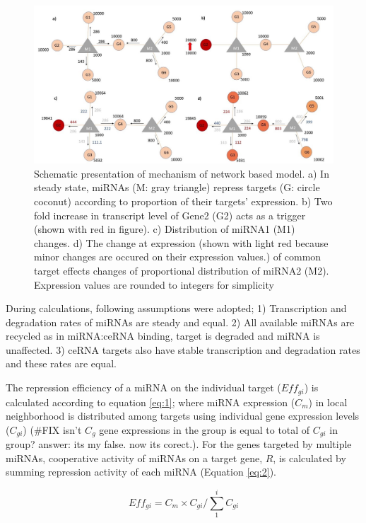 \documentclass[]{article}
\begin{document}
\begin{figure}
\hypertarget{fig1}{%
\centering
\includegraphics{Fig1.jpg}
\caption{Schematic presentation of mechanism of network based model. a)
In steady state, miRNAs (M: gray triangle) repress targets (G: circle
coconut) according to proportion of their targets' expression. b) Two
fold increase in transcript level of Gene2 (G2) acts as a trigger (shown
with red in figure). c) Distribution of miRNA1 (M1) changes. d) The
change at expression (shown with light red because minor changes are
occured on their expression values.) of common target effects changes of
proportional distribution of miRNA2 (M2). Expression values are rounded
to integers for simplicity}\label{fig1}
}
\end{figure}

During calculations, following assumptions were adopted; 1)
Transcription and degradation rates of miRNAs are steady and equal. 2)
All available miRNAs are recycled as in miRNA:ceRNA binding, target is
degraded and miRNA is unaffected. 3) ceRNA targets also have stable
transcription and degradation rates and these rates are equal.

The repression efficiency of a miRNA on the individual target
(\(Eff_{gi}\)) is calculated according to equation \eqref{eq:1}; where
miRNA expression (\(C_m\)) in local neighborhood is distributed among
targets using individual gene expression levels (\(C_{gi}\)) (\#FIX
isn't \(C_g\) gene expressions in the group is equal to total of
\(C_{gi}\) in group? answer: its my false. now its corect.). For the
genes targeted by multiple miRNAs, cooperative activity of miRNAs on a
target gene, \(R\), is calculated by summing repression activity of each
miRNA (Equation \eqref{eq:2}).

\begin{equation} 
    Eff_{gi}= C_m \times C_{gi}/\sum_{1}^{i} C_{gi} \tag{1}\label{eq:1}
\end{equation}
\end{document}
